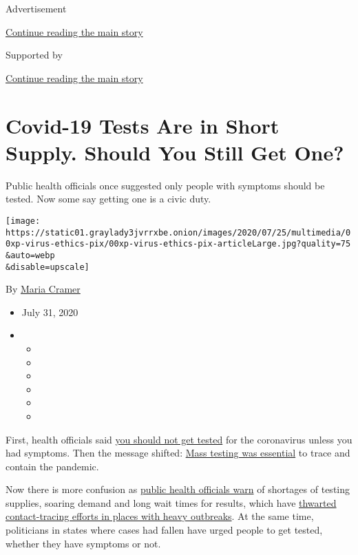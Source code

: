 Advertisement

\protect\hyperlink{after-top}{Continue reading the main story}

Supported by

\protect\hyperlink{after-sponsor}{Continue reading the main story}

\hypertarget{covid-19-tests-are-in-short-supply-should-you-still-get-one}{%
\section{Covid-19 Tests Are in Short Supply. Should You Still Get
One?}\label{covid-19-tests-are-in-short-supply-should-you-still-get-one}}

Public health officials once suggested only people with symptoms should
be tested. Now some say getting one is a civic duty.

\texttt{[image: https://static01.graylady3jvrrxbe.onion/images/2020/07/25/multimedia/00xp-virus-ethics-pix/00xp-virus-ethics-pix-articleLarge.jpg?quality=75\\\&auto=webp\\\&disable=upscale]}

By \href{https://www.nytimes3xbfgragh.onion/by/maria-cramer}{Maria
Cramer}

\begin{itemize}
\item
  July 31, 2020
\item
  \begin{itemize}
  \item
  \item
  \item
  \item
  \item
  \item
  \end{itemize}
\end{itemize}

First, health officials said
\href{https://www.washingtonpost.com/health/2020/03/21/coronavirus-testing-strategyshift/}{you
should not get tested} for the coronavirus unless you had symptoms. Then
the message shifted:
\href{https://www.nytimes3xbfgragh.onion/2020/07/01/health/coronavirus-pooled-testing.html}{Mass
testing was essential} to trace and contain the pandemic.

Now there is more confusion as
\href{https://www.nytimes3xbfgragh.onion/2020/07/23/health/coronavirus-testing-supply-shortage.html}{public
health officials warn} of shortages of testing supplies, soaring demand
and long wait times for results, which have
\href{https://www.nytimes3xbfgragh.onion/2020/07/31/health/covid-contact-tracing-tests.html}{thwarted
contact-tracing efforts in places with heavy outbreaks}. At the same
time, politicians in states where cases had fallen have urged people to
get tested, whether they have symptoms or not.

